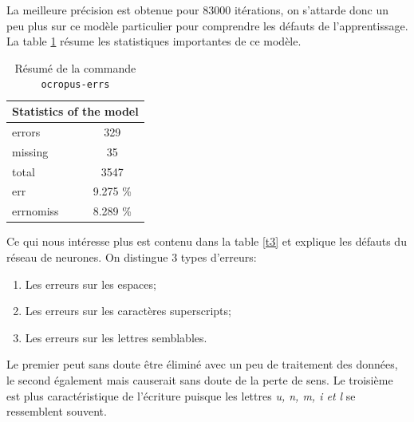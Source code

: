 \documentclass{report}
\begin{document}
La meilleure précision est obtenue pour 83000 itérations, on s'attarde donc un peu plus sur ce modèle particulier pour comprendre les défauts de l'apprentissage.
La table \ref{t2} résume les statistiques importantes de ce modèle.

\begin{table}[!h]
    \centering
    \begin{tabular}{|l|l|lc|l|l|}
        \hline
        \multicolumn{6}{|c|}{\cellcolor[gray]{0.8}Statistics of the model} \\ \hline
        \multicolumn{3}{|l|}{errors}    & \multicolumn{3}{c|}{329}         \\ \hline
        \multicolumn{3}{|l|}{missing}   & \multicolumn{3}{c|}{35}          \\ \hline
        \multicolumn{3}{|l|}{total}     & \multicolumn{3}{c|}{3547}        \\ \hline
        \multicolumn{3}{|l|}{err}       & \multicolumn{3}{c|}{9.275 \%}    \\ \hline
        \multicolumn{3}{|l|}{errnomiss} & \multicolumn{3}{c|}{8.289 \%}    \\ \hline
    \end{tabular}
    \caption{Résumé de la commande \texttt{ocropus-errs}}
    \label{t2}
\end{table}

Ce qui nous intéresse plus est contenu dans la table \ref{t3} et explique les défauts du réseau de neurones.
On distingue 3 types d'erreurs:

\begin{enumerate}[parsep=0.1cm,itemsep=0.1cm,topsep=0.1cm]
    \item Les erreurs sur les espaces;
    \item Les erreurs sur les caractères superscripts;
    \item Les erreurs sur les lettres semblables. 
\end{enumerate}

\noindent Le premier peut sans doute être éliminé avec un peu de traitement des données, le second également mais causerait sans doute de la perte de sens.
Le troisième est plus caractéristique de l'écriture puisque les lettres \textit{u, n, m, i et l} se ressemblent souvent.
\end{document}
